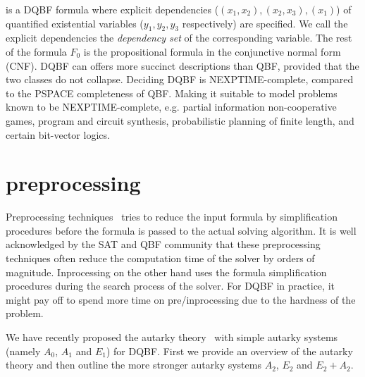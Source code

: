 \documentclass[conference]{IEEEtran}
\begin{document}
is a DQBF formula where explicit dependencies ($(x_1,x_2), (x_2,x_3), (x_1)$) of quantified existential variables ($y_1, y_2, y_3$ respectively) are specified. We call the explicit dependencies the \textit{dependency set} of the corresponding variable. 
%
The rest of the formula $F_0$ is the propositional formula in the conjunctive normal form (CNF).
%
DQBF can offers more succinct descriptions than
QBF, provided that the two classes do not collapse.
%
Deciding DQBF is NEXPTIME-complete, compared to the PSPACE completeness of QBF.
%
Making it suitable to model problems known to be NEXPTIME-complete, e.g. partial information non-cooperative games, program and circuit synthesis, probabilistic planning of finite length, and certain bit-vector logics.

\section{preprocessing}
\label{sec:pre}
Preprocessing techniques~\cite{een2005effective} 
%
tries to reduce the input formula by simplification procedures before the formula is passed to the actual solving algorithm.
%
It is well acknowledged by the SAT and QBF community that these preprocessing techniques often reduce the computation time of the solver by orders of magnitude.
Inprocessing on the other hand uses the formula simplification procedures during the search process of the solver. 
%
For DQBF in practice, it might pay off to spend
more time on pre/inprocessing due to the hardness of the problem.

%

%
We have recently proposed the autarky theory~\cite{oliverfmcad} with simple autarky systems (namely $A_0$, $A_1$ and $E_1$) for DQBF. 
%
First we provide an overview of the autarky theory and then outline the more stronger autarky systems $A_2$, $E_2$ and $E_2 + A_2$. 
%
\end{document}
